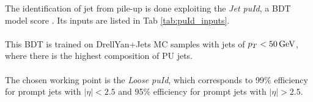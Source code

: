 \begin{minipage}{\linewidth}
    \begin{minipage}{0.4\linewidth}
        The identification of jet from pile-up is done exploiting the \emph{Jet puId},
        a BDT model score \cite{CMSCollaboration2020PileupData}. Its inputs are listed in Tab \ref{tab:puId_inputs}.\\
        \\
        This BDT is trained on DrellYan+Jets MC samples with jets of $p_T<50{\,\text{Ge\hspace{-.08em}V}}$, where there is the highest composition of PU jets.\\
        \\
        The chosen working point is the \emph{Loose puId}, which corresponds to 99\%  efficiency for prompt jets with $|\eta| < 2.5$ and 95\% efficiency for prompt jets with $|\eta| > 2.5$.
    \end{minipage}
    \hfill
    \begin{minipage}{0.55\linewidth}
        \vspace{-1.5cm}
    

\end{minipage}
\end{minipage}
